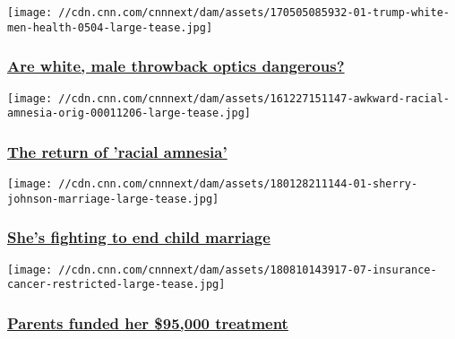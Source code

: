 \href{/2017/05/25/us/too-many-white-men/index.html}{}

\texttt{[image: //cdn.cnn.com/cnnnext/dam/assets/170505085932-01-trump-white-men-health-0504-large-tease.jpg]}

\hypertarget{are-white-male-throwback-optics-dangerous}{%
\subsubsection{\texorpdfstring{\href{/2017/05/25/us/too-many-white-men/index.html}{Are
white, male throwback optics
dangerous?}}{Are white, male throwback optics dangerous?}}\label{are-white-male-throwback-optics-dangerous}}

\href{/2016/12/28/us/lost-cause-trump/index.html}{}

\texttt{[image: //cdn.cnn.com/cnnnext/dam/assets/161227151147-awkward-racial-amnesia-orig-00011206-large-tease.jpg]}

\hypertarget{the-return-of-racial-amnesia}{%
\subsubsection{\texorpdfstring{\href{/2016/12/28/us/lost-cause-trump/index.html}{The
return of 'racial
amnesia'}}{The return of 'racial amnesia'}}\label{the-return-of-racial-amnesia}}

\href{/2018/01/29/health/ending-child-marriage-in-america/index.html}{}

\texttt{[image: //cdn.cnn.com/cnnnext/dam/assets/180128211144-01-sherry-johnson-marriage-large-tease.jpg]}

\hypertarget{shes-fighting-to-end-child-marriage}{%
\subsubsection{\texorpdfstring{\href{/2018/01/29/health/ending-child-marriage-in-america/index.html}{She's
fighting to end child
marriage}}{She's fighting to end child marriage}}\label{shes-fighting-to-end-child-marriage}}

\href{/2018/08/15/health/cancer-survivor-insurance-denial-battle/index.html}{}

\texttt{[image: //cdn.cnn.com/cnnnext/dam/assets/180810143917-07-insurance-cancer-restricted-large-tease.jpg]}

\hypertarget{parents-funded-her-95000-treatment}{%
\subsubsection{\texorpdfstring{\href{/2018/08/15/health/cancer-survivor-insurance-denial-battle/index.html}{Parents
funded her \$95,000
treatment}}{Parents funded her \$95,000 treatment}}\label{parents-funded-her-95000-treatment}}

